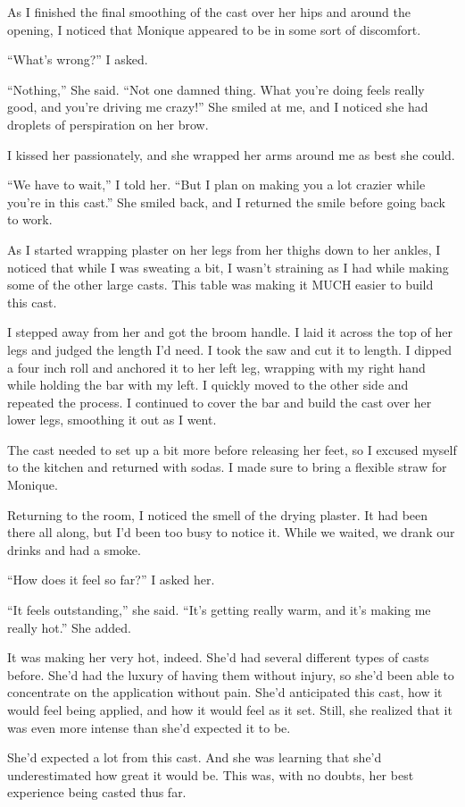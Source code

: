 As I finished the final smoothing of the cast over her hips and around the opening, I
noticed that Monique appeared to be in some sort of discomfort.

``What's wrong?'' I asked.

``Nothing,'' She said. ``Not one damned thing. What you're doing feels really good, and you're
driving me crazy!'' She smiled at me, and I noticed she had droplets of perspiration on her
brow.

I kissed her passionately, and she wrapped her arms around me as best she could.

``We have to wait,'' I told her. ``But I plan on making you a lot crazier while you're in this
cast.'' She smiled back, and I returned the smile before going back to work.

As I started wrapping plaster on her legs from her thighs down to her ankles, I noticed
that while I was sweating a bit, I wasn't straining as I had while making some of the other
large casts. This table was making it MUCH easier to build this cast.

I stepped away from her and got the broom handle. I laid it across the top of her legs and
judged the length I'd need. I took the saw and cut it to length. I dipped a four inch roll and
anchored it to her left leg, wrapping with my right hand while holding the bar with my left. I
quickly moved to the other side and repeated the process. I continued to cover the bar and build
the cast over her lower legs, smoothing it out as I went.

The cast needed to set up a bit more before releasing her feet, so I excused myself to the
kitchen and returned with sodas. I made sure to bring a flexible straw for Monique.

Returning to the room, I noticed the smell of the drying plaster. It had been there all
along, but I'd been too busy to notice it. While we waited, we drank our drinks and had a smoke.

``How does it feel so far?'' I asked her.

``It feels outstanding,'' she said. ``It's getting really warm, and it's making me really
hot.'' She added.

\begin{thought}
It was making her very hot, indeed. She'd had several different types of casts before.
She'd had the luxury of having them without injury, so she'd been able to concentrate on the
application without pain. She'd anticipated this cast, how it would feel being applied, and how
it would feel as it set. Still, she realized that it was even more intense than she'd expected
it to be.

She'd expected a lot from this cast. And she was learning that she'd underestimated how
great it would be. This was, with no doubts, her best experience being casted thus far.
\end{thought}

